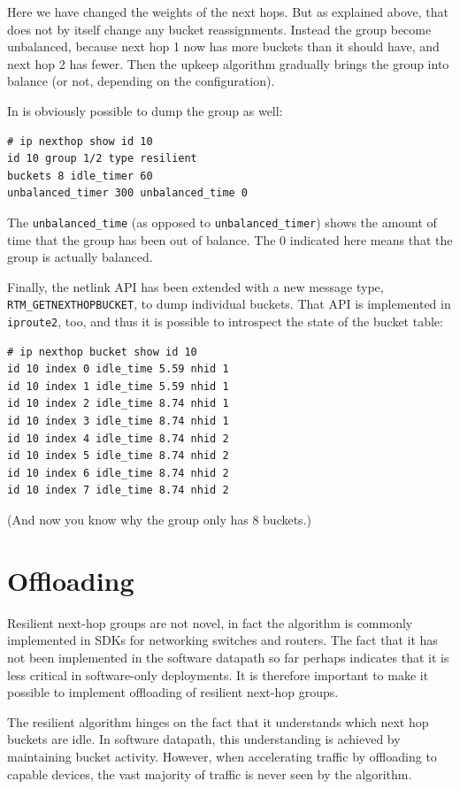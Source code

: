 \documentclass[letterpaper]{article}
\begin{document}
Here we have changed the weights of the next hops. But as explained above,
that does not by itself change any bucket reassignments. Instead the group
become unbalanced, because next hop 1 now has more buckets than it should
have, and next hop 2 has fewer. Then the upkeep algorithm gradually brings
the group into balance (or not, depending on the configuration).

In is obviously possible to dump the group as well:

\begin{verbatim}
# ip nexthop show id 10
id 10 group 1/2 type resilient
buckets 8 idle_timer 60
unbalanced_timer 300 unbalanced_time 0
\end{verbatim}

The \texttt{unbalanced\_time} (as opposed to \texttt{unbalanced\_timer})
shows the amount of time that the group has been out of balance. The 0
indicated here means that the group is actually balanced.

Finally, the netlink API has been extended with a new message type,
\texttt{RTM\_GETNEXTHOPBUCKET}, to dump individual buckets. That API is
implemented in \texttt{iproute2}, too, and thus it is possible to
introspect the state of the bucket table:

\begin{verbatim}
# ip nexthop bucket show id 10
id 10 index 0 idle_time 5.59 nhid 1
id 10 index 1 idle_time 5.59 nhid 1
id 10 index 2 idle_time 8.74 nhid 1
id 10 index 3 idle_time 8.74 nhid 1
id 10 index 4 idle_time 8.74 nhid 2
id 10 index 5 idle_time 8.74 nhid 2
id 10 index 6 idle_time 8.74 nhid 2
id 10 index 7 idle_time 8.74 nhid 2
\end{verbatim}

(And now you know why the group only has 8 buckets.)

\section{Offloading}

Resilient next-hop groups are not novel, in fact the algorithm is commonly
implemented in SDKs for networking switches and routers. The fact that it
has not been implemented in the software datapath so far perhaps indicates
that it is less critical in software-only deployments. It is therefore
important to make it possible to implement offloading of resilient next-hop
groups.

The resilient algorithm hinges on the fact that it understands which next
hop buckets are idle. In software datapath, this understanding is achieved
by maintaining bucket activity. However, when accelerating traffic by
offloading to capable devices, the vast majority of traffic is never seen
by the algorithm.
\end{document}
